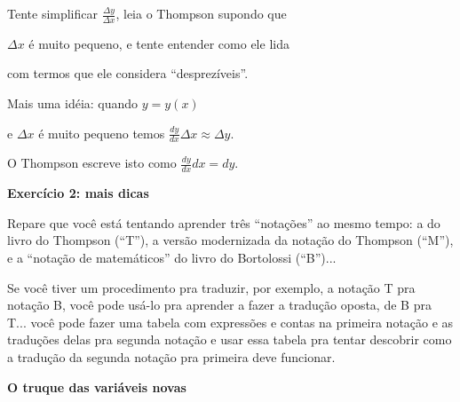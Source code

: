 \documentclass[oneside,12pt]{article}
\begin{document}
Tente simplificar $\frac{Δy}{Δx}$, leia o Thompson supondo que

$Δx$ é muito pequeno, e tente entender como ele lida

com termos que ele considera ``desprezíveis''.

\bsk

Mais uma idéia: quando $y=y(x)$

e $Δx$ é muito pequeno temos $\frac{dy}{dx}Δx ≈ Δy$.

O Thompson escreve isto como $\frac{dy}{dx}dx = dy$.


\newpage


{\bf Exercício 2: mais dicas}

Repare que você está tentando aprender três ``notações'' ao mesmo
tempo: a do livro do Thompson (``T''), a versão modernizada da notação
do Thompson (``M''), e a ``notação de matemáticos'' do livro do
Bortolossi (``B'')...

Se você tiver um procedimento pra traduzir, por exemplo, a notação T
pra notação B, você pode usá-lo pra aprender a fazer a tradução
oposta, de B pra T... você pode fazer uma tabela com expressões e
contas na primeira notação e as traduções delas pra segunda notação e
usar essa tabela pra tentar descobrir como a tradução da segunda
notação pra primeira deve funcionar.




\newpage


{\bf O truque das variáveis novas}
\end{document}
